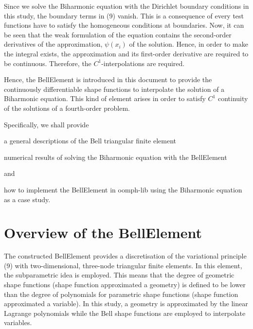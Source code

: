 Since we solve the Biharmonic equation with the Dirichlet boundary conditions in this study, the boundary terms in (9) vanish. This is a consequence of every test functions have to satisfy the homogeneous conditions at boundaries. Now, it can be seen that the weak formulation of the equation contains the second-\/order derivatives of the approximation, $ \psi(x_i) $ of the solution. Hence, in order to make the integral exists, the approximation and its first-\/order derivative are required to be continuous. Therefore, the $ C^1 $-\/interpolations are required.

Hence, the {\ttfamily Bell\+Element} is introduced in this document to provide the continuously differentiable shape functions to interpolate the solution of a Biharmonic equation. This kind of element arises in order to satisfy $ C^1 $ continuity of the solutions of a fourth-\/order problem.

Specifically, we shall provide


\begin{DoxyItemize}
\item a general descriptions of the Bell triangular finite element
\end{DoxyItemize}
\begin{DoxyItemize}
\item numerical results of solving the Biharmonic equation with the {\ttfamily Bell\+Element} 
\end{DoxyItemize}and
\begin{DoxyItemize}
\item how to implement the {\ttfamily Bell\+Element} in {\ttfamily oomph-\/lib} using the Biharmonic equation as a case study.
\end{DoxyItemize}

 

\hypertarget{index_overview}{}\section{Overview of the Bell\+Element}\label{index_overview}
The constructed {\ttfamily Bell\+Element} provides a discretisation of the variational principle (9) with two-\/dimensional, three-\/node triangular finite elements. In this element, the subparametric idea is employed. This means that the degree of geometric shape functions (shape function approximated a geometry) is defined to be lower than the degree of polynomials for parametric shape functions (shape function approximated a variable). In this study, a geometry is approximated by the linear Lagrange polynomials while the Bell shape functions are employed to interpolate variables.

